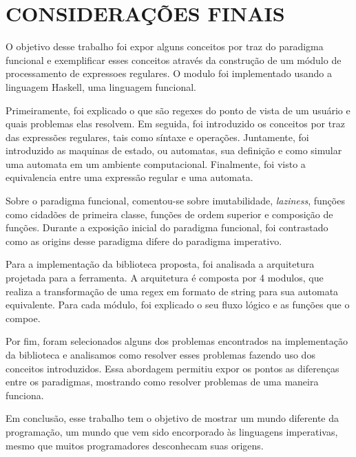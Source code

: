 \section{CONSIDERAÇÕES FINAIS}

O objetivo desse trabalho foi expor alguns conceitos por traz do paradigma funcional e exemplificar esses conceitos através da construção de um módulo de processamento de expressoes regulares.
O modulo foi implementado usando a linguagem Haskell, uma linguagem funcional.

Primeiramente, foi explicado o que são regexes do ponto de vista de um usuário e quais problemas elas resolvem.
Em seguida, foi introduzido os conceitos por traz das expressões regulares, tais como síntaxe e operações.
Juntamente, foi introduzido as maquinas de estado, ou automatas, sua definição e como simular uma automata em um ambiente computacional.
Finalmente, foi visto a equivalencia entre uma expressão regular e uma automata.

Sobre o paradigma funcional, comentou-se sobre imutabilidade, \emph{laziness}, funções como cidadões de primeira classe, funções de ordem superior e composição de funções.
Durante a exposição inicial do paradigma funcional, foi contrastado como as origins desse paradigma difere do paradigma imperativo.

Para a implementação da biblioteca proposta, foi analisada a arquitetura projetada para a ferramenta.
A arquitetura é composta por 4 modulos, que realiza a transformação de uma regex em formato de string para sua automata equivalente.
Para cada módulo, foi explicado o seu fluxo lógico e as funções que o compoe.

Por fim, foram selecionados alguns dos problemas encontrados na implementação da biblioteca e analisamos como resolver esses problemas  fazendo uso dos conceitos introduzidos.
Essa abordagem permitiu expor os pontos as diferenças entre os paradigmas, mostrando como resolver problemas de uma maneira funciona.

Em conclusão, esse trabalho tem o objetivo de mostrar um mundo diferente da programação, um mundo que vem sido encorporado às linguagens imperativas, mesmo que muitos programadores desconhecam suas origens.
